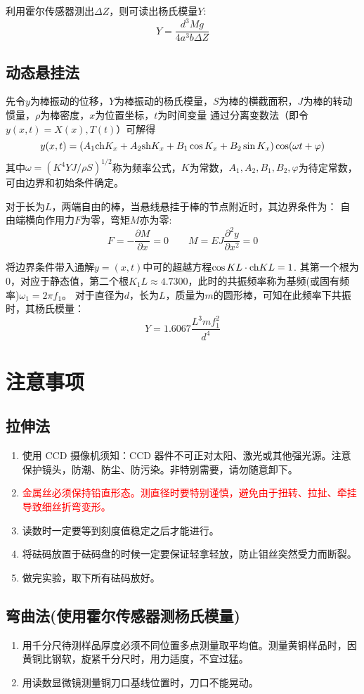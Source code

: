 \documentclass[11pt]{article}
\begin{document}
	利用霍尔传感器测出$\Delta Z$，则可读出杨氏模量$Y$:
		\[Y=\frac{d^3 Mg}{4a^3 b \Delta Z}\]
	
	\subsection{动态悬挂法}
	先令$y$为棒振动的位移，$Y$为棒振动的杨氏模量，$S$为棒的横截面积，$J$为棒的转动惯量，$\rho$为棒密度，$x$为位置坐标，$t$为时间变量
	通过分离变数法（即令$y(x,t)=X(x),T(t)$）可解得
	\[
	y(x,t)=\left(A_1{\rm ch}K_x+A_2{\rm sh}K_x+B_1\cos K_x+B_2\sin K_x \right)\cos (\omega t+\varphi)
	\]
	其中$\omega=\left(K^4YJ/\rho S\right)^{1/2}$称为频率公式，$K$为常数，$A_1,A_2,B_1,B_2,\varphi$为待定常数，可由边界和初始条件确定。
	
	对于长为$L$，两端自由的棒，当悬线悬挂于棒的节点附近时，其边界条件为：
	自由端横向作用力$F$为零，弯矩$M$亦为零:
	\[
	F=-\frac{\partial M}{\partial x} =0\qquad 
	M=EJ\frac{\partial^2y}{\partial x^2}=0
	\]
	
	将边界条件带入通解$y=(x,t)$中可的超越方程$\cos KL\cdot {\rm ch}KL=1$.
	其第一个根为$0$，对应于静态值，第二个根$K_1L\approx 4.7300$，此时的共振频率称为基频(或固有频率)$\omega_1=2\pi f_1$。
	对于直径为$d$，长为$L$，质量为$m$的圆形棒，可知在此频率下共振时，其杨氏模量：
	\[
	Y=1.6067\frac{L^3mf_1^2}{d^4} 
	\]
	
	
	
	\section{注意事项}
	
	\subsection{拉伸法}
	\begin{enumerate}
		\item 使用 CCD 摄像机须知：CCD 器件不可正对太阳、激光或其他强光源。注意保护镜头，防潮、防尘、防污染。非特别需要，请勿随意卸下。
		\item \textcolor{red}{金属丝必须保持铅直形态。测直径时要特别谨慎，避免由于扭转、拉扯、牵挂导致细丝折弯变形。}
		\item  读数时一定要等到刻度值稳定之后才能进行。
		\item 将砝码放置于砝码盘的时候一定要保证轻拿轻放，防止钼丝突然受力而断裂。
		\item 做完实验，取下所有砝码放好。
	\end{enumerate}
	
	\subsection{弯曲法(使用霍尔传感器测杨氏模量)}
	\begin{enumerate}
		\item 用千分尺待测样品厚度必须不同位置多点测量取平均值。测量黄铜样品时，因黄铜比钢软，旋紧千分尺时，用力适度，不宜过猛。
		\item 用读数显微镜测量铜刀口基线位置时，刀口不能晃动。
	\end{enumerate}
	
\end{document}
